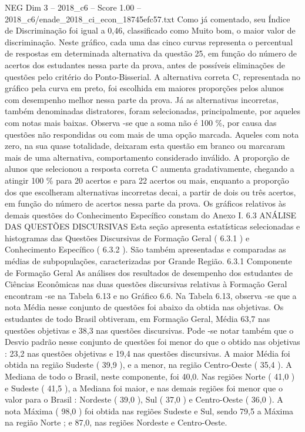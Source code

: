 \begin{textsample}{NEG Dim 3 – 2018\_c6 – Score 1.00 – 2018\_c6/enade\_2018\_ci\_econ\_18745efc57.txt}
Como já comentado, seu Índice de Discriminação foi igual a 0,46, classificado como Muito bom, o maior valor de discriminação.
Neste gráfico, cada uma das cinco curvas representa o percentual de respostas em determinada alternativa da questão 25, em função do número de acertos dos estudantes nessa parte da prova, antes de possíveis eliminações de questões pelo critério do Ponto-Bisserial.
A alternativa correta C, representada no gráfico pela curva em preto, foi escolhida em maiores proporções pelos alunos com desempenho melhor nessa parte da prova.
Já as alternativas incorretas, também denominadas distratores, foram selecionadas, principalmente, por aqueles com notas mais baixas.
Observa -se que a soma não é 100 \%, por causa das questões não respondidas ou com mais de uma opção marcada.
Aqueles com nota zero, na sua quase totalidade, deixaram esta questão em branco ou marcaram mais de uma alternativa, comportamento considerado inválido.
A proporção de alunos que selecionou a resposta correta C aumenta gradativamente, chegando a atingir 100 \% para 20 acertos e para 22 acertos ou mais, enquanto a proporção dos que escolheram alternativas incorretas decai, a partir de dois ou três acertos, em função do número de acertos nessa parte da prova.
Os gráficos relativos às demais questões do Conhecimento Específico constam do Anexo I. 6.3 ANÁLISE DAS QUESTÕES DISCURSIVAS Esta seção apresenta estatísticas selecionadas e histogramas das Questões Discursivas de Formação Geral ( 6.3.1 ) e Conhecimento Específico ( 6.3.2 ).
São também apresentadas e comparadas as médias de subpopulações, caracterizadas por Grande Região. 6.3.1 Componente de Formação Geral As análises dos resultados de desempenho dos estudantes de Ciências Econômicas nas duas questões discursivas relativas à Formação Geral encontram -se na Tabela 6.13 e no Gráfico 6.6.
Na Tabela 6.13, observa -se que a nota Média nesse conjunto de questões foi abaixo da obtida nas objetivas.
Os estudantes de todo Brasil obtiveram, em Formação Geral, Média 63,7 nas questões objetivas e 38,3 nas questões discursivas.
Pode -se notar também que o Desvio padrão nesse conjunto de questões foi menor do que o obtido nas objetivas : 23,2 nas questões objetivas e 19,4 nas questões discursivas.
A maior Média foi obtida na região Sudeste ( 39,9 ), e a menor, na região Centro-Oeste ( 35,4 ).
A Mediana de todo o Brasil, neste componente, foi 40,0.
Nas regiões Norte ( 41,0 ) e Sudeste ( 41,5 ), a Mediana foi maior, e nas demais regiões foi menor que o valor para o Brasil : Nordeste ( 39,0 ), Sul ( 37,0 ) e Centro-Oeste ( 36,0 ).
A nota Máxima ( 98,0 ) foi obtida nas regiões Sudeste e Sul, sendo 79,5 a Máxima na região Norte ; e 87,0, nas regiões Nordeste e Centro-Oeste.

\end{textsample}
